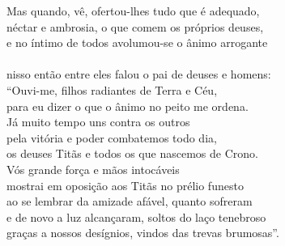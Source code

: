 \begin{pages}
\begin{Rightside}
\quad{}Mas quando, vê, ofertou-lhes tudo que é adequado,\\
néctar e ambrosia, o que comem os próprios deuses, \\
e no íntimo de todos avolumou-se o ânimo arrogante\\
\\
nisso então entre eles falou o pai de deuses e homens:\\
``Ouvi-me, filhos radiantes de Terra e Céu,\\
para eu dizer o que o ânimo no peito me ordena. \\
Já muito tempo uns contra os outros\\
pela vitória e poder combatemos todo dia,\\
os deuses Titãs e todos os que nascemos de Crono.\\
Vós grande força e mãos intocáveis\\
mostrai em oposição aos Titãs no prélio funesto \\
ao se lembrar da amizade afável, quanto sofreram\\
e de novo a luz alcançaram, soltos do laço tenebroso\\
graças a nossos desígnios, vindos das trevas brumosas''.\\


\end{Rightside}
\end{pages}
